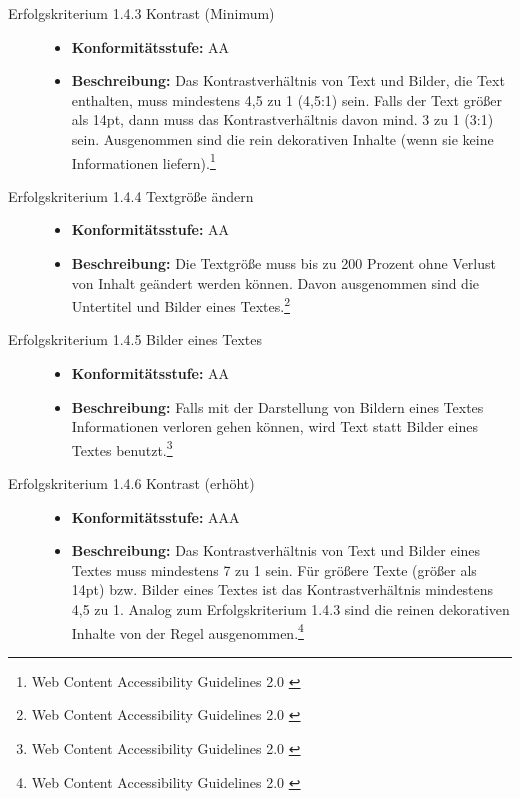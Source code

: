 \begin{description}
\begin{description}
		\item[Erfolgskriterium 1.4.3 Kontrast (Minimum)]\hfill
		\begin{itemize}
			\item \textbf{Konformitätsstufe:} AA
			\item \textbf{Beschreibung:} Das Kontrastverhältnis von Text und Bilder, die Text enthalten, muss mindestens 4,5 zu 1 (4,5:1) sein. Falls der Text größer 
			als 14pt, dann muss das Kontrastverhältnis davon mind. 3 zu 1 (3:1) sein. Ausgenommen sind die rein dekorativen Inhalte (wenn sie keine Informationen
			 liefern).\footnote{Web Content Accessibility Guidelines 2.0 \cite{WCAG2.0}}
		\end{itemize}
		
		\item[Erfolgskriterium 1.4.4 Textgröße ändern]\hfill
		\begin{itemize}
			\item \textbf{Konformitätsstufe:} AA
			\item \textbf{Beschreibung:} Die Textgröße muss bis zu 200 Prozent ohne Verlust von Inhalt geändert werden können. Davon ausgenommen sind die 
			Untertitel und Bilder eines Textes.\footnote{Web Content Accessibility Guidelines 2.0 \cite{WCAG2.0}}
		\end{itemize}
		
		\item[Erfolgskriterium 1.4.5 Bilder eines Textes]\hfill
		\begin{itemize}
			\item \textbf{Konformitätsstufe:} AA
			\item \textbf{Beschreibung:} Falls mit der Darstellung von Bildern eines Textes Informationen verloren gehen können, wird Text statt Bilder eines Textes 
			benutzt.\footnote{Web Content Accessibility Guidelines 2.0 \cite{WCAG2.0}}
		\end{itemize}
		
		\item[Erfolgskriterium 1.4.6 Kontrast (erhöht)]\hfill
		\begin{itemize}
			\item \textbf{Konformitätsstufe:} AAA
			\item \textbf{Beschreibung:} Das Kontrastverhältnis von Text und Bilder eines Textes muss mindestens 7 zu 1 sein. Für größere Texte (größer als 14pt) bzw. 
			Bilder eines Textes ist das Kontrastverhältnis mindestens 4,5 zu 1. Analog zum Erfolgskriterium 1.4.3 sind die reinen dekorativen Inhalte von 
			der Regel ausgenommen.\footnote{Web Content Accessibility Guidelines 2.0 \cite{WCAG2.0}}
		\end{itemize}
		

\end{description}
\end{description}
